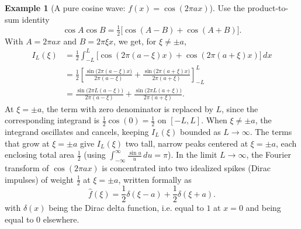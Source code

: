 \documentclass[11pt]{article}
\theoremstyle{plain}
\theoremstyle{definition}
\newtheorem{example}[theorem]{Example}
\theoremstyle{boldremark}
\theoremstyle{remark}
\numberwithin{equation}{section}
\begin{document}
\begin{example}[A pure cosine wave: $f(x)=\cos(2\pi ax)$]
Use the product-to-sum identity
\[
 \cos A\cos B = \tfrac12\bigl[\cos(A-B)+\cos(A+B)\bigr].
\]
With $A=2\pi ax$ and $B=2\pi\xi x$, we get, for $\xi\ne\pm a$,
\begin{align*}
 I_L(\xi)
  &= \frac12\int_{-L}^{L}
     \bigl[\cos(2\pi(a-\xi)x)+\cos(2\pi(a+\xi)x)\bigr]\,dx \\
  &= \frac12\left[
      \frac{\sin\bigl(2\pi(a-\xi)x\bigr)}{2\pi(a-\xi)}
    + \frac{\sin\bigl(2\pi(a+\xi)x\bigr)}{2\pi(a+\xi)}
     \right]_{-L}^{L} \\
  &= \frac{\sin\bigl(2\pi L(a-\xi)\bigr)}{2\pi(a-\xi)}
   + \frac{\sin\bigl(2\pi L(a+\xi)\bigr)}{2\pi(a+\xi)}.
\end{align*}
At $\xi=\pm a$, the term with zero denominator is replaced by $L$, since
the corresponding integrand is $\tfrac12\cos(0)=\tfrac12$ on $[-L,L]$. When $\xi\ne\pm a$, the integrand oscillates and cancels, keeping
$I_L(\xi)$ bounded as $L\to\infty$. The terms that grow at $\xi=\pm a$
give $I_L(\xi)$ two tall, narrow
peaks centered at $\xi=\pm a$, each enclosing total area $\frac{1}{2}$
(using $\int_{-\infty}^{\infty}\frac{\sin u}{u}\,du=\pi$). In the limit
$L\to\infty$, the Fourier transform of $\cos(2\pi ax)$ is concentrated
into two idealized spikes (Dirac impulses) of weight $\frac{1}{2}$ at
$\xi=\pm a$, written formally as
\[
 \widehat{f}(\xi)
  = \frac{1}{2}\delta(\xi-a) + \frac{1}{2}\delta(\xi+a).
\]
with $\delta(x)$ being the Dirac delta function, i.e. equal to $1$ at $x=0$ and being equal to $0$ elsewhere.


\end{example}
\end{document}
